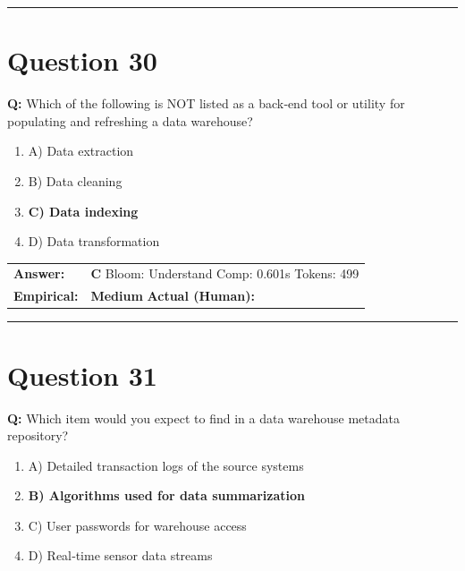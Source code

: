 \documentclass[9pt]{article}
\begin{document}
\vspace{0.2cm}
\rule{\textwidth}{0.4pt}
\vspace{0.2cm}


\section*{Question 30}

\textbf{Q:} Which of the following is NOT listed as a back‑end tool or utility for populating and refreshing a data warehouse?

\begin{enumerate}[label=\textbf{\alph{*})}, nosep]
    \item A) Data extraction
    \item B) Data cleaning
    \item \textbf{C) Data indexing} %
    \item D) Data transformation

\end{enumerate}

\begin{tabular}{@{}l p{10.5cm}@{}}
\textbf{Answer:} & \textbf{C} \hspace{1em} Bloom: Understand \hspace{1em} Comp: 0.601s \hspace{1em} Tokens: 499 \\
\textbf{Empirical:} & \textbf{Medium} \hspace{1em} \textbf{Actual (Human):} \underline{\hspace{5cm}}
\end{tabular}

\vspace{0.2cm}
\rule{\textwidth}{0.4pt}
\vspace{0.2cm}


\section*{Question 31}

\textbf{Q:} Which item would you expect to find in a data warehouse metadata repository?

\begin{enumerate}[label=\textbf{\alph{*})}, nosep]
    \item A) Detailed transaction logs of the source systems
    \item \textbf{B) Algorithms used for data summarization} %
    \item C) User passwords for warehouse access
    \item D) Real‑time sensor data streams

\end{enumerate}
\end{document}
